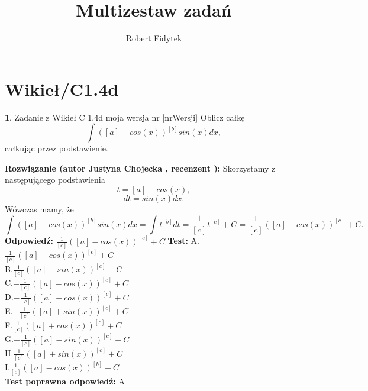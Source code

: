 \documentclass[12pt, a4paper]{article}
\title{Multizestaw zadań}
\author{Robert Fidytek}
\date{}
\theoremstyle{definition} %
\newtheorem{zad}{}
\newcommand{\kategoria}[1]{\section{#1}} %
\newcommand{\zadStart}[1]{\begin{zad}#1\newline} %
\newcommand{\zadStop}{\end{zad}}   %
\newcommand{\rozwStart}[2]{\noindent \textbf{Rozwiązanie (autor #1 , recenzent #2): }\newline} %
\newcommand{\rozwStop}{\newline}                                            %
\newcommand{\odpStart}{\noindent \textbf{Odpowiedź:}\newline}    %
\newcommand{\odpStop}{\newline}                                             %
\newcommand{\testStart}{\noindent \textbf{Test:}\newline} %
\newcommand{\testStop}{\newline} %
\newcommand{\kluczStart}{\noindent \textbf{Test poprawna odpowiedź:}\newline} %
\newcommand{\kluczStop}{\newline} %
\begin{document}
\maketitle
\kategoria{Wikieł/C1.4d}
\zadStart{Zadanie z Wikieł C 1.4d moja wersja nr [nrWersji]}
Oblicz całkę $$\int \left([a]-cos(x)\right)^{[b]}sin(x) dx,$$ całkując przez podstawienie.
\zadStop
\rozwStart{Justyna Chojecka}{}
Skorzystamy z następującego podstawienia
$$t=[a]-cos(x),$$
$$dt=sin(x)dx.$$
Wówczas mamy, że
$$\int \left([a]-cos(x)\right)^{[b]}sin(x) dx=\int t^{[b]}dt=\frac{1}{[c]}t^{[c]}+C=\frac{1}{[c]}\left([a]-cos(x)\right)^{[c]}+C.$$
\rozwStop
\odpStart
$\frac{1}{[c]}\left([a]-cos(x)\right)^{[c]}+C$
\odpStop
\testStart
A.$\frac{1}{[c]}\left([a]-cos(x)\right)^{[c]}+C$\\
B.$\frac{1}{[c]}\left([a]-sin(x)\right)^{[c]}+C$\\
C.$-\frac{1}{[c]}\left([a]-cos(x)\right)^{[c]}+C$\\
D.$-\frac{1}{[c]}\left([a]+cos(x)\right)^{[c]}+C$\\
E.$-\frac{1}{[c]}\left([a]+sin(x)\right)^{[c]}+C$\\
F.$\frac{1}{[c]}\left([a]+cos(x)\right)^{[c]}+C$\\
G.$-\frac{1}{[c]}\left([a]-sin(x)\right)^{[c]}+C$\\
H.$\frac{1}{[c]}\left([a]+sin(x)\right)^{[c]}+C$\\
I.$\frac{1}{[c]}\left([a]-cos(x)\right)^{[b]}+C$\\
\testStop
\kluczStart
A
\kluczStop
\end{document}
